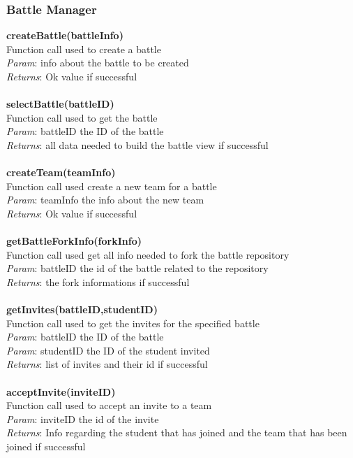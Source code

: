 \documentclass{article}
\begin{document}
\subsubsection{Battle Manager}
\textbf{createBattle(battleInfo)}\\
Function call used to create a battle\\
\textit{Param}: info about the battle to be created\\
\textit{Returns}: Ok value if successful\\
\\
\textbf{selectBattle(battleID)}\\
Function call used to get the battle\\
\textit{Param}: battleID the ID of the battle\\
\textit{Returns}: all data needed to build the battle view if successful\\
\\
\textbf{createTeam(teamInfo)}\\
Function call used create a new team for a battle\\
\textit{Param}: teamInfo the info about the new team\\
\textit{Returns}: Ok value if successful\\
\\
\textbf{getBattleForkInfo(forkInfo)}\\
Function call used get all info needed to fork the battle repository\\
\textit{Param}: battleID the id of the battle related to the repository\\
\textit{Returns}: the fork informations if successful\\
\\
\textbf{getInvites(battleID,studentID)}\\
Function call used to get the invites for the specified battle\\
\textit{Param}: battleID the ID of the battle\\
\textit{Param}: studentID the ID of the student invited\\
\textit{Returns}: list of invites and their id if successful\\
\\
\textbf{acceptInvite(inviteID)}\\
Function call used to accept an invite to a team\\
\textit{Param}: inviteID the id of the invite\\
\textit{Returns}: Info regarding the student that has joined and the team that has been joined if successful\\
\end{document}
